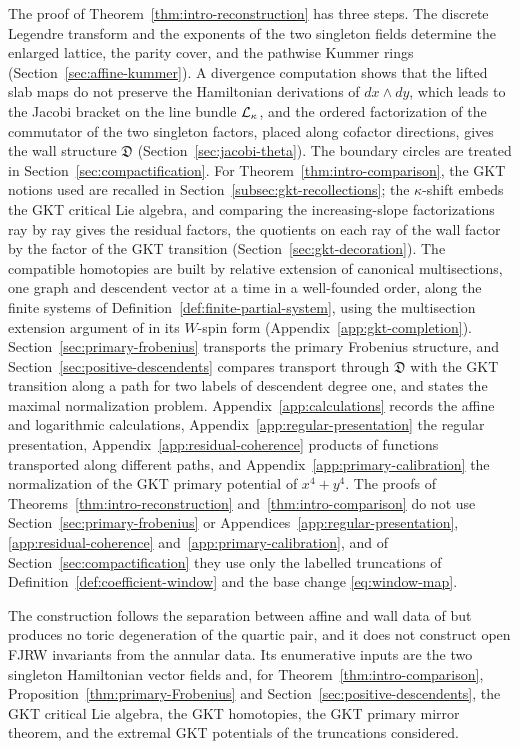The proof of Theorem~\ref{thm:intro-reconstruction} has three steps.  The
discrete Legendre transform and the exponents of the two singleton fields
determine the enlarged lattice, the parity cover, and the pathwise Kummer
rings (Section~\ref{sec:affine-kummer}).  A divergence computation shows that the
lifted slab maps do not preserve the Hamiltonian derivations of
$dx\wedge dy$, which leads to the Jacobi bracket on the line bundle
$\mathcal L_\kappa$, and
the ordered factorization of the commutator of
the two singleton factors, placed along cofactor directions, gives the
wall structure $\mathfrak D$ (Section~\ref{sec:jacobi-theta}).  The boundary circles
are treated in Section~\ref{sec:compactification}.  For
Theorem~\ref{thm:intro-comparison}, the GKT notions used are recalled in
Section~\ref{subsec:gkt-recollections}; the $\kappa$-shift embeds the GKT critical Lie
algebra, and comparing the increasing-slope factorizations ray by ray gives
the residual factors, the quotients on each ray of the wall factor by the
factor of the GKT transition (Section~\ref{sec:gkt-decoration}).  The compatible
homotopies are built by relative extension of canonical multisections, one
graph and descendent vector at a time in a well-founded order, along the
finite systems of Definition~\ref{def:finite-partial-system}, using
the multisection extension argument of \cite{buryaketal2024} in its $W$-spin
form \cite[Lem.~5.15]{grossetal2022open} (Appendix~\ref{app:gkt-completion}).
Section~\ref{sec:primary-frobenius} transports the primary Frobenius
structure, and Section~\ref{sec:positive-descendents} compares transport through
$\mathfrak D$ with the GKT transition along a path for two labels of
descendent degree one, and states the maximal normalization problem.
Appendix~\ref{app:calculations} records the affine and logarithmic
calculations, Appendix~\ref{app:regular-presentation} the regular
presentation, Appendix~\ref{app:residual-coherence} products of functions transported
along different paths, and Appendix~\ref{app:primary-calibration} the normalization
of the GKT primary potential of $x^4+y^4$.  The proofs of
Theorems~\ref{thm:intro-reconstruction} and~\ref{thm:intro-comparison} do
not use Section~\ref{sec:primary-frobenius} or
Appendices~\ref{app:regular-presentation}, \ref{app:residual-coherence}
and~\ref{app:primary-calibration}, and of Section~\ref{sec:compactification}
they use only the labelled truncations of
Definition~\ref{def:coefficient-window} and the base change
\eqref{eq:window-map}.

The construction follows the separation between affine and wall data of
\cite{grosshackingkeel2015,grossetal2018canonical,grosssiebert2022} but
produces no toric degeneration of the quartic pair, and it does not construct
open FJRW invariants from the annular data.  Its enumerative inputs are the
two singleton Hamiltonian vector fields and, for Theorem~\ref{thm:intro-comparison},
Proposition~\ref{thm:primary-Frobenius} and
Section~\ref{sec:positive-descendents}, the GKT critical Lie algebra, the GKT
homotopies, the GKT primary mirror theorem, and the extremal GKT potentials
of the truncations considered.

